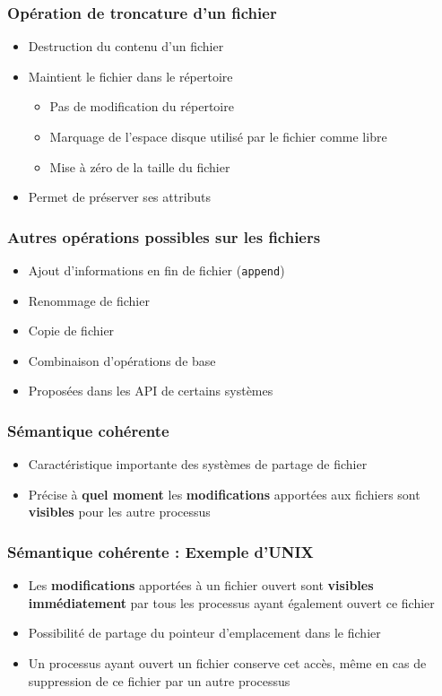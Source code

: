 \begin{frame}
\frametitle{Opération de troncature d'un fichier}
\begin{itemize}
\item Destruction du contenu d'un fichier
\item Maintient le fichier dans le répertoire
\begin{itemize}
\item Pas de modification du répertoire
\item Marquage de l'espace disque utilisé par le fichier comme libre
\item Mise à zéro de la taille du fichier
\end{itemize}
\item Permet de préserver ses attributs
\end{itemize}
\end{frame}

\begin{frame}
\frametitle{Autres opérations possibles sur les fichiers}
\begin{itemize}
\item Ajout d'informations en fin de fichier (\texttt{append})
\item Renommage de fichier
\item Copie de fichier
\end{itemize}
\begin{itemize}
\item Combinaison d'opérations de base
\item Proposées dans les API de certains systèmes
\end{itemize}
\end{frame}



\begin{frame}
\frametitle{Sémantique cohérente}
\begin{itemize}
\item Caractéristique importante des systèmes de partage de fichier
\item Précise à \textbf{quel moment} les \textbf{modifications} apportées aux fichiers sont \textbf{visibles} pour les autre processus
\end{itemize}
\end{frame}

\begin{frame}
\frametitle{Sémantique cohérente : Exemple d'UNIX}
\begin{itemize}
\item Les \textbf{modifications} apportées à un fichier ouvert sont \textbf{visibles immédiatement} par tous les processus ayant également ouvert ce fichier
\item Possibilité de partage du pointeur d'emplacement dans le fichier
\item Un processus ayant ouvert un fichier conserve cet accès, même en cas de suppression de ce fichier par un autre processus
\end{itemize}
\end{frame}


